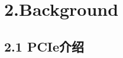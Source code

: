 \documentclass[10pt]{ctexbeamer}
\begin{document}

\section[2.Background]{2.Background}\label{sec:2}
\subsection{2.1 PCIe介绍}\label{sec:2-1}
\end{document}
